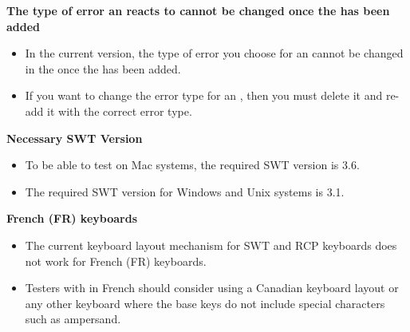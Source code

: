 \textbf{The type of error an \gdehandler{} reacts to cannot be changed once the \gdehandler{} has been added}\\
\begin{itemize}
\item  In the current version, the type of error you choose for an \gdehandler{} cannot be changed in the \gdpropview{} once the \gdehandler{} has been added.
\item If you want to change the error type for an \gdehandler{}, then you must delete it and re-add it with the correct error type. 
\end{itemize}

\textbf{Necessary SWT Version}\\
\begin{itemize}
\item To be able to test \gdauts{} on Mac systems, the required SWT version is 3.6. 
\item The required SWT version for Windows and Unix systems is 3.1.
\end{itemize}


\textbf{French (FR) keyboards}\\
\begin{itemize}
\item The current keyboard layout mechanism for SWT and RCP keyboards does not work for French (FR) keyboards.
\item Testers with \gdauts{} in French should consider using a Canadian keyboard layout or any other keyboard where the 
base keys do not include special characters such as ampersand.
\end{itemize}
